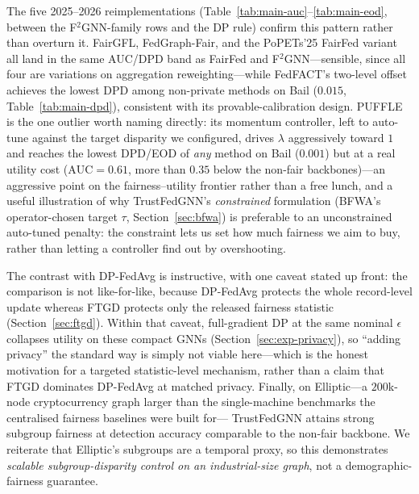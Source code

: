\documentclass[pdflatex,sn-mathphys-num]{sn-jnl}
\theoremstyle{thmstyleone}%
\theoremstyle{thmstyletwo}%
\theoremstyle{thmstylethree}%
\begin{document}
The five 2025--2026 reimplementations (Table~\ref{tab:main-auc}--\ref{tab:main-eod},
between the F$^2$GNN-family rows and the DP rule) confirm this pattern rather
than overturn it. FairGFL, FedGraph-Fair, and the PoPETs'25 FairFed variant
all land in the same AUC/DPD band as FairFed and F$^2$GNN---sensible, since
all four are variations on aggregation reweighting---while FedFACT's two-level
offset achieves the lowest DPD among non-private methods on Bail ($0.015$,
Table~\ref{tab:main-dpd}), consistent with its provable-calibration design.
PUFFLE is the one outlier worth naming directly: its momentum controller, left
to auto-tune against the target disparity we configured, drives $\lambda$
aggressively toward $1$ and reaches the lowest DPD/EOD of \emph{any} method on
Bail ($0.001$) but at a real utility cost ($\mathrm{AUC}{=}0.61$, more than
$0.35$ below the non-fair backbones)---an aggressive point on the
fairness--utility frontier rather than a free lunch, and a useful illustration
of why TrustFedGNN's \emph{constrained} formulation (BFWA's operator-chosen
target $\tau$, Section~\ref{sec:bfwa}) is preferable to an unconstrained
auto-tuned penalty: the constraint lets us set how much fairness we aim to buy,
rather than letting a controller find out by overshooting.

The contrast with DP-FedAvg is instructive, with one caveat stated up front: the
comparison is not like-for-like, because DP-FedAvg protects the whole
record-level update whereas FTGD protects only the released fairness statistic
(Section~\ref{sec:ftgd}). Within that caveat, full-gradient DP at the same
nominal $\epsilon$ collapses utility on these compact GNNs
(Section~\ref{sec:exp-privacy}), so ``adding privacy'' the standard way is simply
not viable here---which is the honest motivation for a targeted statistic-level
mechanism, rather than a claim that FTGD dominates DP-FedAvg at matched privacy.
Finally, on Elliptic---a $200$k-node cryptocurrency graph larger than the
single-machine benchmarks the centralised fairness baselines were built for---
TrustFedGNN attains strong subgroup fairness at detection accuracy comparable to
the non-fair backbone. We reiterate that Elliptic's subgroups are a temporal
proxy, so this demonstrates \emph{scalable subgroup-disparity control on an
industrial-size graph}, not a demographic-fairness guarantee.

\begin{table}[t]\centering\small
\caption{Utility (AUC-ROC, higher is better). Mean\,$\pm$\,std over seeds:
\textbf{10} on the small/high-variance German, \textbf{5} on Bail and Pokec, and
2--3 on the larger Credit/Elliptic (see Section~\ref{sec:exp-main} for the
paired Wilcoxon discussion, and Table~\ref{tab:statistical_significance} for
the 10-seed Pokec-z/Credit comparisons). Best per column in bold. TrustFedGNN is the only method that is
fair \emph{and} private (methods above the rule are non-private).
$^{\ast}$FaVGNN is a horizontal adaptation of a vertical-FL method.
FairGFL/FedGraph-Fair/PUFFLE/FedFACT/PoPETs'25 are 2025--2026 reimplementations
with approximated fidelity (Appendix~\ref{app:baselines}).}
\label{tab:main-auc}
{\footnotesize\setlength{\tabcolsep}{3pt}}
\end{table}
\end{document}
